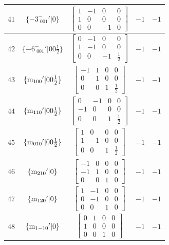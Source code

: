 \documentclass[fleqn,8pt]{jsarticle}
\begin{document}
\begin{longtable}{ccccc}
$ 41 $ & $ \{-3^{-}_{\,\,001}{}'|0\} $ & $ \begin{bmatrix} 1 & -1 & 0 & 0 \\ 1 & 0 & 0 & 0 \\ 0 & 0 & -1 & 0 \end{bmatrix} $ & $ -1 $ & $ -1 $ \\ \hline
$ 42 $ & $ \{-6^{-}_{\,\,001}{}'|0 0 \frac{1}{2}\} $ & $ \begin{bmatrix} 0 & -1 & 0 & 0 \\ 1 & -1 & 0 & 0 \\ 0 & 0 & -1 & \frac{1}{2} \end{bmatrix} $ & $ -1 $ & $ -1 $ \\ \hline
$ 43 $ & $ \{{\rm m}_{100}{}'|0 0 \frac{1}{2}\} $ & $ \begin{bmatrix} -1 & 1 & 0 & 0 \\ 0 & 1 & 0 & 0 \\ 0 & 0 & 1 & \frac{1}{2} \end{bmatrix} $ & $ -1 $ & $ -1 $ \\ \hline
$ 44 $ & $ \{{\rm m}_{110}{}'|0 0 \frac{1}{2}\} $ & $ \begin{bmatrix} 0 & -1 & 0 & 0 \\ -1 & 0 & 0 & 0 \\ 0 & 0 & 1 & \frac{1}{2} \end{bmatrix} $ & $ -1 $ & $ -1 $ \\ \hline
$ 45 $ & $ \{{\rm m}_{010}{}'|0 0 \frac{1}{2}\} $ & $ \begin{bmatrix} 1 & 0 & 0 & 0 \\ 1 & -1 & 0 & 0 \\ 0 & 0 & 1 & \frac{1}{2} \end{bmatrix} $ & $ -1 $ & $ -1 $ \\ \hline
$ 46 $ & $ \{{\rm m}_{210}{}'|0\} $ & $ \begin{bmatrix} -1 & 0 & 0 & 0 \\ -1 & 1 & 0 & 0 \\ 0 & 0 & 1 & 0 \end{bmatrix} $ & $ -1 $ & $ -1 $ \\ \hline
$ 47 $ & $ \{{\rm m}_{120}{}'|0\} $ & $ \begin{bmatrix} 1 & -1 & 0 & 0 \\ 0 & -1 & 0 & 0 \\ 0 & 0 & 1 & 0 \end{bmatrix} $ & $ -1 $ & $ -1 $ \\ \hline
$ 48 $ & $ \{{\rm m}_{1-10}{}'|0\} $ & $ \begin{bmatrix} 0 & 1 & 0 & 0 \\ 1 & 0 & 0 & 0 \\ 0 & 0 & 1 & 0 \end{bmatrix} $ & $ -1 $ & $ -1 $ \\
\end{longtable}
\end{document}
